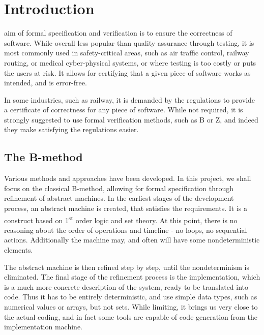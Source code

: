 \documentclass[11pt,journal]{IEEEtran}
\begin{document}
	
	\IEEEpeerreviewmaketitle
	
	
	
	\section{Introduction}
	 aim of formal specification and verification is to ensure the correctness of software. While overall less popular than quality assurance through testing, it is most commonly used in safety-critical areas, such as air traffic control, railway routing, or medical cyber-physical systems, or where testing is too costly or puts the users at risk. It allows for certifying that a given piece of software works as intended, and is error-free.
	
	In some industries, such as railway, it is demanded by the regulations to provide a certificate of correctness for any piece of software. While not required, it is strongly suggested to use formal verification methods, such as B or Z, and indeed they make satisfying the regulations easier.\cite{railway standard}
	
	\subsection{The B-method}
	Various methods and approaches have been developed. In this project, we shall focus on the classical B-method, allowing for formal specification through refinement of abstract machines. In the earliest stages of the development process, an abstract machine is created, that satisfies the requirements. It is a construct based on 1\textsuperscript{st} order logic and set theory. At this point, there is no reasoning about the order of operations and timeline - no loops, no sequential actions. Additionally the machine may, and often will have some nondeterministic elements. 
	
	The abstract machine is then refined step by step, until the nondeterminism is eliminated. The final stage of the refinement process is the implementation, which is a much more concrete description of the system, ready to be translated into code. Thus it has to be entirely deterministic, and use simple data types, such as numerical values or arrays, but not sets. While limiting, it brings us very close to the actual coding, and in fact some tools are capable of code generation from the implementation machine.
	
\end{document}

